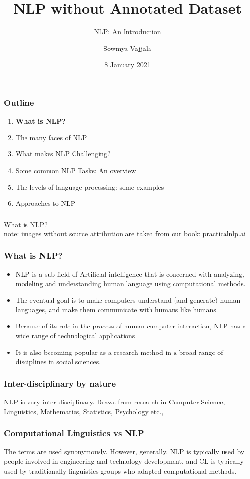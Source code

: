 \documentclass{beamer}
\author[Sowmya Vajjala]{Sowmya Vajjala}
\title[SfSNLP]{NLP without Annotated Dataset}
\subtitle{NLP: An Introduction}
\date{8 January 2021}
\institute{Seminar f\"ur Sprachwissenschaft, University of T\"ubingen, Germany}
\begin{document}
\begin{frame}\titlepage
\end{frame}

\begin{frame}
\frametitle{Outline}
\begin{enumerate}
    \item \textbf{What is NLP?}
    \item The many faces of NLP
    \item What makes NLP Challenging?
    \item Some common NLP Tasks: An overview
     \item The levels of language processing: some examples    
     \item Approaches to NLP
\end{enumerate}
\end{frame}

\begin{frame}
\frametitle{}
\bigskip
\Large What is NLP?
 \\
\tiny note: images without source attribution are taken from our book: practicalnlp.ai 
\end{frame}


\begin{frame}
\frametitle{What is NLP?}
\begin{itemize}
\item NLP is a sub-field of Artificial intelligence that is concerned with analyzing, modeling and understanding human language using computational methods. \pause \item The eventual goal is to make computers understand (and generate) human languages, and make them communicate with humans like humans
\pause \item Because of its role in the process of human-computer interaction, NLP has a wide range of technological applications
\pause \item It is also becoming popular as a research method in a broad range of disciplines in social sciences. 
\end{itemize}
\end{frame}


\begin{frame}
\frametitle{Inter-disciplinary by nature}
NLP is very inter-disciplinary. Draws from research in Computer Science, Linguistics, Mathematics, Statistics, Psychology etc.,
\end{frame}

\begin{frame}
\frametitle{Computational Linguistics vs NLP}
The terms are used synonymously. However, generally, NLP is typically used by people involved in engineering and technology development, and CL is typically used by traditionally linguistics groups who adapted computational methods.
\end{frame}
\end{document}
